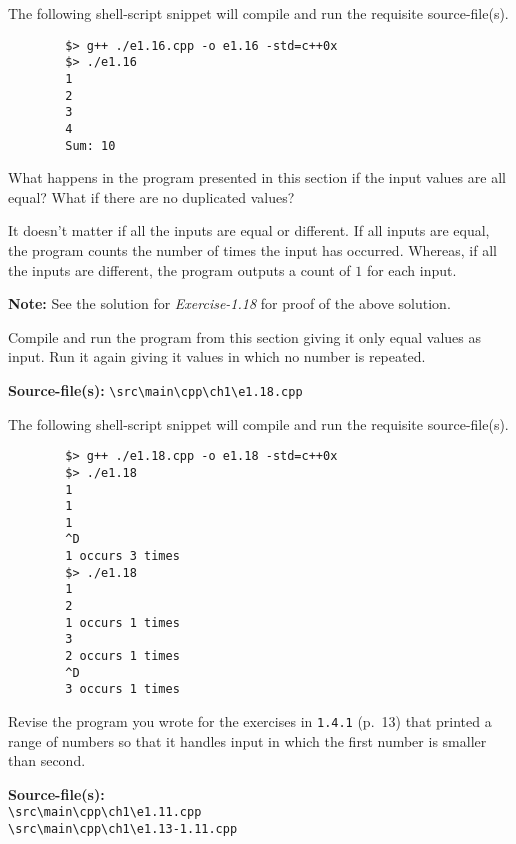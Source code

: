 \documentclass[12pt, a4paper]{article}
\begin{document}
    \noindent The following shell-script snippet will compile and run the requisite source-file(s).
    \begin{verbatim}
        $> g++ ./e1.16.cpp -o e1.16 -std=c++0x
        $> ./e1.16
        1
        2
        3
        4
        Sum: 10
    \end{verbatim}

    \bigskip
    \begin{tcolorbox}[title={Exercise: 1.17}]
        What happens in the program presented in this section if the input values are all equal?
        What if there are no duplicated values?
    \end{tcolorbox}
    \noindent It doesn't matter if all the inputs are equal or different.
    If all inputs are equal, the program counts the number of times the input has occurred.
    Whereas, if all the inputs are different, the program outputs a count of $1$ for each input.

    \noindent\textbf{Note:} See the solution for \textit{Exercise-1.18} for proof of the above solution.

    \bigskip
    \begin{tcolorbox}[title={Exercise: 1.18}]
        Compile and run the program from this section giving it only equal values as input.
        Run it again giving it values in which no number is repeated.
    \end{tcolorbox}
    \noindent\textbf{Source-file(s):} \texttt{\textbackslash src\textbackslash main\textbackslash cpp\textbackslash ch1\textbackslash e1.18.cpp}

    \noindent The following shell-script snippet will compile and run the requisite source-file(s).
    \begin{verbatim}
        $> g++ ./e1.18.cpp -o e1.18 -std=c++0x
        $> ./e1.18
        1
        1
        1
        ^D
        1 occurs 3 times
        $> ./e1.18
        1
        2
        1 occurs 1 times
        3
        2 occurs 1 times
        ^D
        3 occurs 1 times
    \end{verbatim}

    \bigskip
    \begin{tcolorbox}[title={Exercise: 1.19}]
        Revise the program you wrote for the exercises in \texttt{1.4.1} (p.~13) that printed a range of numbers so that it handles input in which the first number is smaller than second.
    \end{tcolorbox}
    \noindent\textbf{Source-file(s):}
    \\ \texttt{\textbackslash src\textbackslash main\textbackslash cpp\textbackslash ch1\textbackslash e1.11.cpp}
    \\ \texttt{\textbackslash src\textbackslash main\textbackslash cpp\textbackslash ch1\textbackslash e1.13-1.11.cpp}
\end{document}
